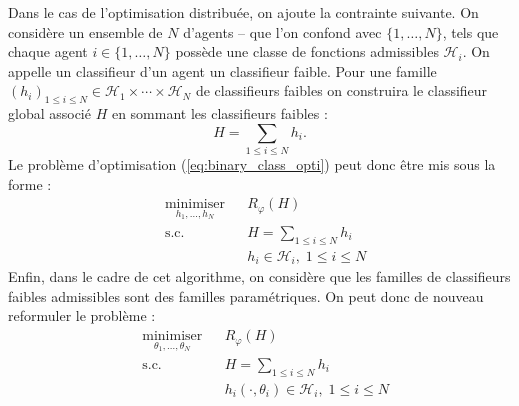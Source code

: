 \documentclass[a4paper]{article}
\begin{document}
Dans le cas de l'optimisation distribu\'ee, on ajoute la contrainte suivante. On considère
un ensemble de $N$ d'agents -- que l'on confond avec $\{1,\ldots,N\}$, tels que chaque
agent $i \in \{1,\ldots,N\}$ possède une classe de fonctions admissibles $\mathcal{H}_i$.
On appelle un classifieur d'un agent un classifieur faible.
Pour une famille $(h_i)_{1 \leq i \leq N} \in \mathcal{H}_1 \times \cdots \times \mathcal{H}_N$ de
classifieurs faibles on construira le classifieur global associ\'e $H$ en sommant les
classifieurs faibles :
\[
    H = \sum_{1 \leq i \leq N} h_i.
\]
Le problème d'optimisation (\ref{eq:binary_class_opti}) peut donc être mis sous la forme :
\[
\begin{aligned}
    & \underset{h_1,\ldots,h_N}{\text{minimiser}}
    & & R_{\varphi}(H) \\
    & \text{s.c.}
    & & H = \sum_{1 \leq i \leq N} h_i \\
    &&& h_i \in \mathcal{H}_i, \; 1 \leq i \leq N
\end{aligned}
\]
Enfin, dans le cadre de cet algorithme, on considère que les familles de classifieurs
faibles admissibles sont des familles param\'etriques. On peut donc de nouveau
reformuler le problème :
\[
\begin{aligned}
    & \underset{\theta_1,\ldots,\theta_N}{\text{minimiser}}
    & & R_{\varphi}(H) \\
    & \text{s.c.}
    & & H = \sum_{1 \leq i \leq N} h_i \\
    &&& h_i(\cdot, \theta_i) \in \mathcal{H}_i, \; 1 \leq i \leq N
\end{aligned}
\]



\end{document}
